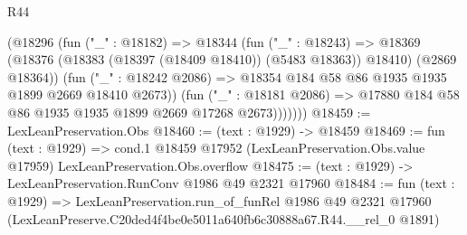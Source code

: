 \begin{lexlean}{R44}
\begin{coremodule}
              (@18296
                (fun ("_" : @18182) =>
                @18344
                  (fun ("_" : @18243) =>
                  @18369
                    (@18376 (@18383 (@18397 (@18409 @18410)) (@5483 @18363)) @18410)
                    (@2869 @18364))
                  (fun ("_" : @18242 @2086) =>
                  @18354 @184 @58 @86 @1935 @1935 @1899 @2669 @18410 @2673))
                (fun ("_" : @18181 @2086) =>
                @17880 @184 @58 @86 @1935 @1935 @1899 @2669 @17268 @2673)))))))
@18459 := LexLeanPreservation.Obs
@18460 := (text : @1929) -> @18459
@18469 := fun (text : @1929) =>
  cond.{1} @18459 @17952 (LexLeanPreservation.Obs.value @17959) LexLeanPreservation.Obs.overflow
@18475 := (text : @1929) -> LexLeanPreservation.RunConv @1986 @49 @2321 @17960
@18484 := fun (text : @1929) =>
  LexLeanPreservation.run_of_funRel
    @1986
    @49
    @2321
    @17960
    (LexLeanPreserve.C20ded4f4be0e5011a640fb6c30888a67.R44.__rel_0 @1891)
\end{coremodule}
\end{lexlean}

